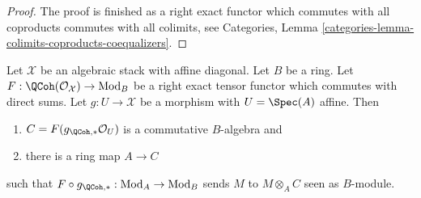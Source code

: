 \begin{proof}
\medskip\noindent
The proof is finished as a right exact functor which commutes with all
coproducts commutes with all colimits, see
Categories, Lemma \ref{categories-lemma-colimits-coproducts-coequalizers}.
\end{proof}

\begin{lemma}
\label{lemma-affine}
Let $\mathcal{X}$ be an algebraic stack with affine diagonal.
Let $B$ be a ring. Let $F : \QCoh(\mathcal{O}_\mathcal{X}) \to \text{Mod}_B$
be a right exact tensor functor which commutes with direct sums.
Let $g : U \to \mathcal{X}$ be a morphism with $U = \Spec(A)$ affine. Then
\begin{enumerate}
\item $C = F(g_{\QCoh, *}\mathcal{O}_U)$ is a commutative $B$-algebra and
\item there is a ring map $A \to C$
\end{enumerate}
such that $F \circ g_{\QCoh, *} : \text{Mod}_A \to \text{Mod}_B$
sends $M$ to $M \otimes_A C$ seen as $B$-module.
\end{lemma}

